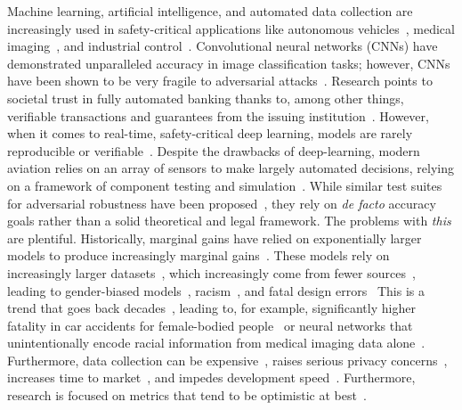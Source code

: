 \documentclass[journal]{IEEEtran}
\newcommand{\cm}[1]{\textit{{\color{blue}#1}}}
\begin{document}
Machine learning, artificial intelligence, and automated data collection are increasingly used in safety-critical applications like autonomous vehicles~\cite{grigorescu2020survey, al2017deep}, medical imaging~\cite{ching2017opportunities, sahiner2019deep}, and industrial control~\cite{fukuda1992theory, monmasson2011fpgas}. Convolutional neural networks (CNNs) have demonstrated unparalleled accuracy in image classification tasks; however, CNNs have been shown to be very fragile to adversarial attacks~\cite{miller_adversarial_2020, finlayson2018adversarial}.  Research points to societal trust in fully automated banking thanks to, among other things, verifiable transactions and guarantees from the issuing institution~\cite{safetyframework}. However, when it comes to real-time, safety-critical deep learning, models are rarely reproducible or verifiable~\cite{tsipras_robustness_2019, carlini_towards_2017}. Despite the drawbacks of deep-learning, modern aviation relies on an array of sensors to make largely automated decisions, relying on a framework of component testing and simulation~\cite{aviation}. While similar test suites for adversarial robustness have been proposed~\cite{carlini_towards_2017, chakraborty_adversarial_2018}, they rely on \textit{de facto} accuracy goals rather than a solid theoretical and legal framework.
The problems with \cm{this} are plentiful. Historically, marginal gains have relied on exponentially larger models to produce increasingly marginal gains~\cite{desislavov2021compute}.  These models rely on increasingly larger datasets~\cite{desislavov2021compute, vapnik1994measuring, blumer1989learnability}, which increasingly come from fewer sources~\cite{koch2021reduced}, leading to gender-biased models~\cite{lu2020gender}, racism~\cite{buolamwini2018gender}, and fatal design errors~\cite{banks2018driver} This is a trend that goes back decades~\cite{corsaro1982something, ramirez2000resource, buolamwini2018gender}, leading to, for example, significantly higher fatality in car accidents for female-bodied people~\cite{evans2001gender} or neural networks that unintentionally encode racial information from medical imaging data alone~\cite{gichoya2022ai}. Furthermore, data collection can be expensive~\cite{roh2019survey}, raises serious privacy concerns~\cite{bloom2017self}, increases time to market~\cite{lam2004new}, and impedes development speed~\cite{zirger1996effect}. Furthermore, research is focused on metrics that tend to be optimistic at best~\cite{madry2017towards}.
\end{document}
